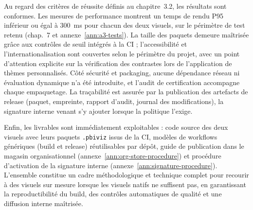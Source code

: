 Au regard des critères de réussite définis au chapitre~3.2, les résultats sont conformes. Les mesures de performance montrent un temps de rendu P95 inférieur ou égal à 300~ms pour chacun des deux visuels, sur le périmètre de test retenu (chap.~7 et annexe~\ref{ann:a3-tests}). La taille des paquets demeure maîtrisée grâce aux contrôles de seuil intégrés à la CI ; l’accessibilité et l’internationalisation sont couvertes selon le périmètre du projet, avec un point d’attention explicite sur la vérification des contrastes lors de l’application de thèmes personnalisés. Côté sécurité et packaging, aucune dépendance réseau ni évaluation dynamique n’a été introduite, et l’audit de certification accompagne chaque empaquetage. La traçabilité est assurée par la publication des artefacts de release (paquet, empreinte, rapport d’audit, journal des modifications), la signature interne venant s’y ajouter lorsque la politique l’exige.

Enfin, les livrables sont immédiatement exploitables : code source des deux visuels avec leurs paquets \texttt{.pbiviz} issus de la CI, modèles de workflows génériques (build et release) réutilisables par dépôt, guide de publication dans le magasin organisationnel (annexe~\ref{ann:org-store-procedure}) et procédure d’activation de la signature interne (annexe~\ref{ann:signature-procedure}). L’ensemble constitue un cadre méthodologique et technique complet pour recourir à des visuels sur mesure lorsque les visuels natifs ne suffisent pas, en garantissant la reproductibilité du build, des contrôles automatiques de qualité et une diffusion interne maîtrisée.
